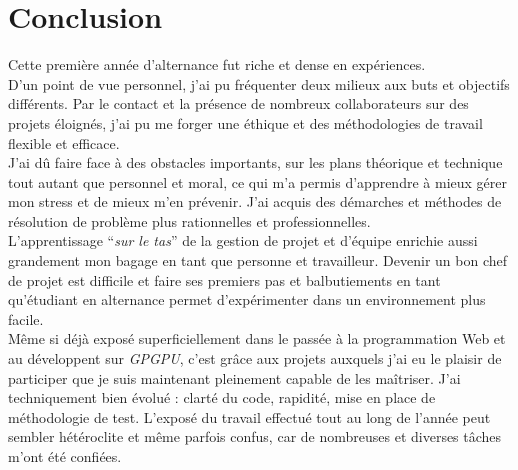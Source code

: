 \documentclass[french, 11pt]{memoir}
\begin{document}
\newpage
\section{Conclusion}\label{conclusion}

Cette première année d'alternance fut riche et dense en expériences. \\
D'un point de vue personnel, j'ai pu fréquenter deux milieux aux buts et
objectifs différents. Par le contact et la présence de nombreux
collaborateurs sur des projets éloignés, j'ai pu me forger une éthique
et des méthodologies de travail flexible et efficace. \\
J'ai dû faire face à des obstacles importants, sur les plans théorique
et technique tout autant que personnel et moral, ce qui m'a permis
d'apprendre à mieux gérer mon stress et de mieux m'en prévenir. J'ai
acquis des démarches et méthodes de résolution de problème plus
rationnelles et professionnelles. \\
L'apprentissage ``\emph{sur le tas}'' de la gestion de projet et
d'équipe enrichie aussi grandement mon bagage en tant que personne et
travailleur. Devenir un bon chef de projet est difficile et faire ses
premiers pas et balbutiements en tant qu'étudiant en alternance permet
d'expérimenter dans un environnement plus facile. \\
Même si déjà exposé superficiellement dans le passée à la programmation
Web et au développent sur \emph{GPGPU}, c'est grâce aux projets auxquels
j'ai eu le plaisir de participer que je suis maintenant pleinement
capable de les maîtriser. J'ai techniquement bien évolué : clarté du
code, rapidité, mise en place de méthodologie de test. L'exposé du
travail effectué tout au long de l'année peut sembler hétéroclite et
même parfois confus, car de nombreuses et diverses tâches m'ont été
confiées.
\end{document}
